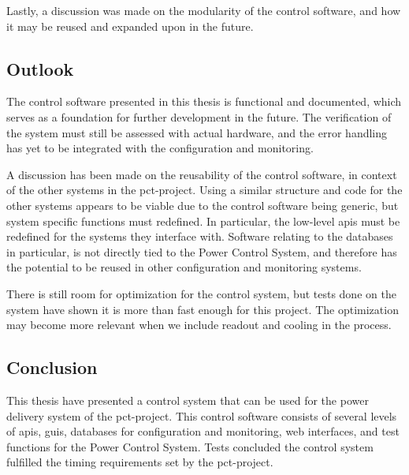 \documentclass[main.tex]{subfiles}
\begin{document}
Lastly, a discussion was made on the modularity of the control software, and how it may be reused and expanded upon in the future.

\subsection{Outlook}
The control software presented in this thesis is functional and documented, which serves as a foundation for further development in the future. The verification of the system must still be assessed with actual hardware, and the error handling has yet to be integrated with the configuration and monitoring.

A discussion has been made on the reusability of the control software, in context of the other systems in the \gls{pct}-project. Using a similar structure and code for the other systems appears to be viable due to the control software being generic, but system specific functions must redefined. In particular, the low-level \gls{api}s must be redefined for the systems they interface with. Software relating to the databases in particular, is not directly tied to the Power Control System, and therefore has the potential to be reused in other configuration and monitoring systems.

There is still room for optimization for the control system, but tests done on the system have shown it is more than fast enough for this project. The optimization may become more relevant when we include readout and cooling in the process.

\subsection{Conclusion}

This thesis have presented a control system that can be used for the power delivery system of the \gls{pct}-project. This control software consists of several levels of \gls{api}s, \gls{gui}s, databases for configuration and monitoring, web interfaces, and test functions for the Power Control System. Tests concluded the control system fulfilled the timing requirements set by the \gls{pct}-project.
\end{document}
